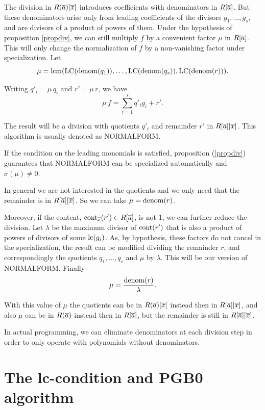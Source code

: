 The division in $R(\overline{a})[\overline{x}]$ introduces coefficients with
denominators in $R[\overline{a}]$. But these denominators arise only from
leading coefficients of the divisors $g_1,\dots, g_s$, and are
divisors of a product of powers of them. Under the hypothesis of
proposition \ref{propdiv}, we can still multiply $f$ by a
convenient factor $\mu$ in $R[\overline{a}]$. This will only change the
normalization of $f$ by a non-vanishing factor under
specialization.
 Let
 \[ \mu=\hbox{\rm lcm}(\hbox{\rm LC}(\hbox{\rm denom}(
 q_1)),\dots,\hbox{\rm LC}(\hbox{\rm denom}(q_s)),\hbox{\rm
 LC}(\hbox{\rm denom}(
 r))).\]

Writing $q'_i=\mu\,q_i$ and $r'=\mu\, r$, we have
\begin{equation} \label{diveq}
 \mu \, f = \sum_{i=1}^s q'_i g_i + r'.
\end{equation}

The result will be a division with quotients $q'_i$ and remainder
$r'$ in $R[\overline{a}][\overline{x}]$. This algorithm is usually denoted as {\sc
NORMALFORM}.

If the condition on the leading monomials is satisfied,
proposition (\ref{propdiv}) guarantees that {\sc NORMALFORM} can
be specialized automatically and $\sigma(\mu) \ne 0$.

In general we are not interested in the quotients and we only need
that the remainder is in $R[\overline{a}][\overline{x}]$. So we can take $
\mu=\hbox{\rm denom}(r)$.

Moreover, if the content, $\hbox{cont}_{\overline{x}}(r') \in R[\overline{a}]$, is
not 1, we can further reduce the division. Let $\lambda$ be the
maximum divisor of $\hbox{cont}(r')$ that is also a product of
powers of divisors of some $\hbox{\rm lc}(g_i)$. As, by hypothesis, these
factors do not cancel in the specialization, the result can be
modified dividing the remainder $r$, and correspondingly the
quotients $q_1,\dots,q_s$ and $\mu$ by $\lambda$. This will be our
version of {\sc NORMALFORM}. Finally
\[ \mu=\frac{\hbox{\rm denom}(r) }{\lambda}. \]

With this value of $\mu$ the quotients can be in  $R(\overline{a})[\overline{x}]$
instead then in $R[\overline{a}][\overline{x}]$, and also $\mu$ can be in $R(\overline{a})$
instead then in $R[\overline{a}]$, but the remainder is still in
$R[\overline{a}][\overline{x}]$.

In actual programming, we can eliminate denominators at each
division step in order to only operate with polynomials without
denominators.

\section{The lc-condition and PGB0 algorithm}

